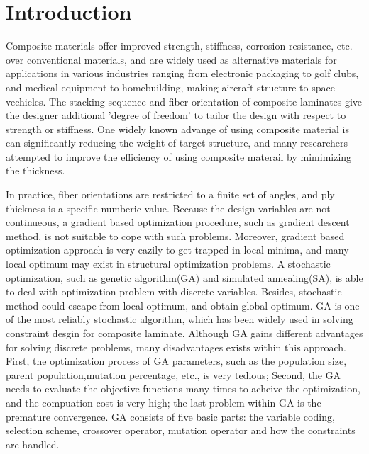 \section{Introduction}
Composite materials offer improved strength, stiffness, corrosion resistance,
etc. over conventional materials, and are widely used as alternative materials
for applications in various industries ranging from electronic packaging to golf
clubs, and medical equipment to homebuilding, making aircraft structure to space
vechicles. The stacking sequence and fiber orientation of composite laminates
give the designer additional 'degree of freedom' to tailor the design with
respect to strength or stiffness.  One widely known advange of using composite
material is can significantly reducing the weight of target structure, and many
researchers attempted to improve the efficiency of using composite materail by
mimimizing the thickness\cite { schmit1973optimum, schmit1977optimum,
	fukunaga1991strength, soares1995discrete, le1995improved,
	jayatheertha1996application, wang1996optimum, adali1997minimum,
	correia1997higher, scares1997optimization, abu1998optimum, lombardi1998anti,
	le1998design, sivakumar1998optimum, barakat1999use, richard2000reliability,
moita2000sensitivity, soremekun2001composite, walker2003technique,
di2003multiconstrained, kere2003using}.

In practice, fiber orientations are restricted to a finite set of angles, and ply thickness is a
specific numberic value.  Because the design variables are not continueous, a gradient based
optimization procedure, such as gradient descent method, is not suitable to cope with such problems.
Moreover, gradient based optimization approach is very eazily to get trapped in local minima, and
many local optimum may exist in structural optimization problems. A stochastic optimization, such as
genetic algorithm(GA) and simulated annealing(SA), is able to deal with optimization problem with
discrete variables. Besides, stochastic method could escape from local optimum, and obtain global
optimum.  GA is one of the most reliably stochastic algorithm, which has been widely used in solving
constraint desgin for composite laminate\cite{callahan1992optimum,soremekun2001composite,park2001stacking,walker2003technique,deka2005multiobjective,pelletier2006multi,jadhav2007parametric,kim2007development,park2008improved}. Although GA gains different advantages for solving
discrete problems, many disadvantages exists within this approach. First, the optimization process
of GA parameters, such as the population size, parent population,mutation percentage, etc., is very
tedious; Second, the GA needs to evaluate the objective functions many times to acheive the
optimization, and the compuation cost is very high; the last problem within GA is the premature
convergence. GA consists of five basic parts: the variable coding, selection scheme, crossover
operator, mutation operator and how the constraints are handled.

